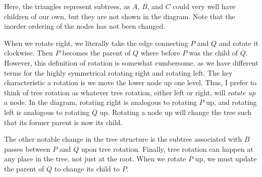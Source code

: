 \documentclass[11pt]{book}
\begin{document}
Here, the triangles represent subtrees, as $A$, $B$, and $C$ could very well have children of our own, but they are not shown in the diagram. Note that the inorder ordering of the nodes has not been changed.

When we rotate right, we literally take the edge connecting $P$ and $Q$ and rotate it clockwise. Then $P$ becomes the parent of $Q$ where before $P$ was the child of $Q$. However, this definition of rotation is somewhat cumbersome, as we have different terms for the highly symmetrical rotating right and rotating left. The key characteristic a rotation is we move the lower node up one level. Thus, I prefer to think of tree rotation as whatever tree rotation, either left or right, will \textit{rotate up} a node. In the diagram, rotating right is analogous to rotating $P$ up, and rotating left is analogous to rotating $Q$ up. Rotating a node up will change the tree such that its former parent is now its child.

The other notable change in the tree structure is the subtree associated with $B$ passes between $P$ and $Q$ upon tree rotation. Finally, tree rotation can happen at any place in the tree, not just at the root. When we rotate $P$ up, we must update the parent of $Q$ to change its child to $P$.

\begin{center}
\end{center}
\end{document}
